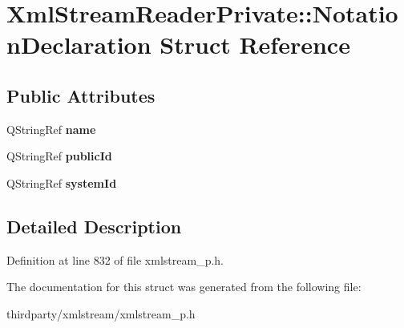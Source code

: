 \hypertarget{struct_xml_stream_reader_private_1_1_notation_declaration}{}\section{Xml\+Stream\+Reader\+Private\+:\+:Notation\+Declaration Struct Reference}
\label{struct_xml_stream_reader_private_1_1_notation_declaration}
\subsection*{Public Attributes}
\begin{DoxyCompactItemize}
\item 
\mbox{\label{struct_xml_stream_reader_private_1_1_notation_declaration_a3ef44b665be73afc1d8b2523c57d2498}} 
Q\+String\+Ref {\bfseries name}
\item 
\mbox{\label{struct_xml_stream_reader_private_1_1_notation_declaration_a751999b4d3d0e4c5ab5c1c805130932b}} 
Q\+String\+Ref {\bfseries public\+Id}
\item 
\mbox{\label{struct_xml_stream_reader_private_1_1_notation_declaration_ac703053b776ac5f3b5a74e2faaa481b1}} 
Q\+String\+Ref {\bfseries system\+Id}
\end{DoxyCompactItemize}


\subsection{Detailed Description}


Definition at line 832 of file xmlstream\+\_\+p.\+h.



The documentation for this struct was generated from the following file\+:\begin{DoxyCompactItemize}
\item 
thirdparty/xmlstream/xmlstream\+\_\+p.\+h\end{DoxyCompactItemize}
